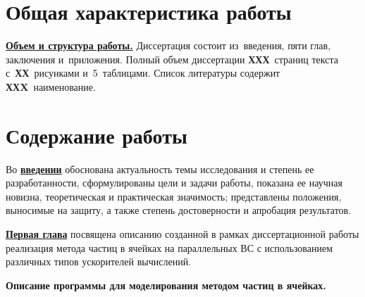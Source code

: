 
\section*{Общая характеристика работы}

\newcommand{\actuality}{\underline{\textbf{\actualityTXT}}}
\newcommand{\progress}{\underline{\textbf{\progressTXT}}}
\newcommand{\aim}{\underline{{\textbf\aimTXT}}}
\newcommand{\tasks}{\underline{\textbf{\tasksTXT}}}
\newcommand{\novelty}{\underline{\textbf{\noveltyTXT}}}
\newcommand{\influence}{\underline{\textbf{\influenceTXT}}}
\newcommand{\methods}{\underline{\textbf{\methodsTXT}}}
\newcommand{\defpositions}{\underline{\textbf{\defpositionsTXT}}}
\newcommand{\reliability}{\underline{\textbf{\reliabilityTXT}}}
\newcommand{\probation}{\underline{\textbf{\probationTXT}}}
\newcommand{\contribution}{\underline{\textbf{\contributionTXT}}}
\newcommand{\publications}{\underline{\textbf{\publicationsTXT}}}



\underline{\textbf{Объем и структура работы.}} Диссертация состоит из~введения,
пяти глав, заключения и~приложения. Полный объем диссертации
\textbf{ХХХ}~страниц текста с~\textbf{ХХ}~рисунками и~5~таблицами. Список литературы содержит \textbf{ХХX}~наименование.

\section*{Содержание работы}
Во \underline{\textbf{введении}} 
обоснована актуальность темы исследования и степень
ее разработанности, сформулированы цели и задачи работы, показана ее научная новизна, теоретическая и практическая значимость; представлены положения, выносимые на защиту, а также степень достоверности и апробация результатов.






\underline{\textbf{Первая глава}} посвящена описанию созданной в рамках диссертационной работы реализация метода частиц в ячейках на параллельных ВС с использованием различных типов ускорителей вычислений. 

\textbf{Описание программы для моделирования методом частиц в ячейках.}

